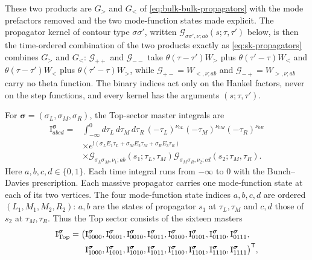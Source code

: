 \documentclass[11pt,a4paper]{article}
\numberwithin{table}{section}
\newcommand{\ii}{\mathrm i}
\begin{document}
These two products are $G_>$ and $G_<$ of \eqref{eq:bulk-bulk-propagators} with the mode prefactors
removed and the two mode-function states made explicit. The propagator kernel of contour type
$\sigma\sigma'$, written $\mathcal G_{\sigma\sigma',\nu;ab}(s;\tau,\tau')$ below, is then the
time-ordered combination of the two products exactly as \eqref{eq:sk-propagators} combines $G_>$
and $G_<$: $\mathcal G_{++}$ and $\mathcal G_{--}$ take $\theta(\tau-\tau')W_{>}$ plus
$\theta(\tau'-\tau)W_{<}$ and $\theta(\tau-\tau')W_{<}$ plus $\theta(\tau'-\tau)W_{>}$, while
$\mathcal G_{+-}=W_{<,\nu;ab}$ and $\mathcal G_{-+}=W_{>,\nu;ab}$ carry no theta function. The binary
indices act only on the Hankel factors, never on the step functions, and every kernel has the
arguments $(s;\tau,\tau')$.

For $\boldsymbol\sigma=(\sigma_L,\sigma_M,\sigma_R)$, the Top-sector master
integrals are
\begin{equation}
 \begin{aligned}
 \text{I}^{\boldsymbol\sigma}_{abcd}
 ={}&\int_{-\infty}^{0}d\tau_L\,d\tau_M\,d\tau_R\,
 (-\tau_L)^{\nu_{0L}}(-\tau_M)^{\nu_{0M}}(-\tau_R)^{\nu_{0R}}\\
 &\times e^{\ii(\sigma_LE_1\tau_L+\sigma_ME_2\tau_M+\sigma_RE_3\tau_R)}\\
 &\times\mathcal G_{\sigma_L\sigma_M,\nu_1;ab}(s_1;\tau_L,\tau_M)
 \mathcal G_{\sigma_M\sigma_R,\nu_2;cd}(s_2;\tau_M,\tau_R).
 \end{aligned}
 \label{eq:tree-indexed-masters}
\end{equation}
Here $a,b,c,d\in\{0,1\}$. Each time integral runs from $-\infty$ to $0$ with the Bunch--Davies
prescription. Each massive propagator carries one mode-function state at each of its two vertices.
The four mode-function state indices $a,b,c,d$ are ordered $(L_1,M_1,M_2,R_2)$: $a,b$ are the
states of propagator $s_1$ at $\tau_L,\tau_M$ and $c,d$ those of $s_2$ at $\tau_M,\tau_R$. Thus the
Top sector consists of the sixteen masters
\begin{equation}
 \begin{aligned}
 \bm{\text I}^{\boldsymbol\sigma}_{\mathrm{Top}}
 =\bigl(&\text{I}^{\boldsymbol\sigma}_{0000},
        \text{I}^{\boldsymbol\sigma}_{0001},
        \text{I}^{\boldsymbol\sigma}_{0010},
        \text{I}^{\boldsymbol\sigma}_{0011},
        \text{I}^{\boldsymbol\sigma}_{0100},
        \text{I}^{\boldsymbol\sigma}_{0101},
        \text{I}^{\boldsymbol\sigma}_{0110},
        \text{I}^{\boldsymbol\sigma}_{0111},\\
       &\text{I}^{\boldsymbol\sigma}_{1000},
        \text{I}^{\boldsymbol\sigma}_{1001},
        \text{I}^{\boldsymbol\sigma}_{1010},
        \text{I}^{\boldsymbol\sigma}_{1011},
        \text{I}^{\boldsymbol\sigma}_{1100},
        \text{I}^{\boldsymbol\sigma}_{1101},
        \text{I}^{\boldsymbol\sigma}_{1110},
        \text{I}^{\boldsymbol\sigma}_{1111}\bigr)^{\mathsf T},
 \end{aligned}
 \label{eq:tree-top-vector}
\end{equation}
\end{document}
